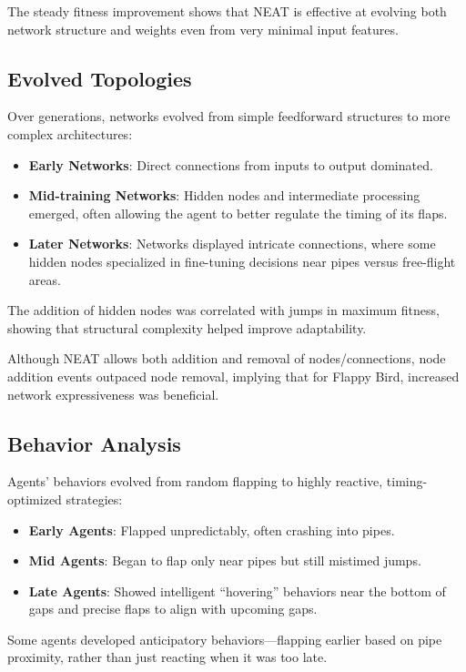 \documentclass[sigconf]{acmart}
\begin{document}
The steady fitness improvement shows that NEAT is effective at evolving both network structure and weights even from very minimal input features.

\subsection{Evolved Topologies}
Over generations, networks evolved from simple feedforward structures to more complex architectures:
\begin{itemize}
    \item \textbf{Early Networks}: Direct connections from inputs to output dominated.
    \item \textbf{Mid-training Networks}: Hidden nodes and intermediate processing emerged, often allowing the agent to better regulate the timing of its flaps.
    \item \textbf{Later Networks}: Networks displayed intricate connections, where some hidden nodes specialized in fine-tuning decisions near pipes versus free-flight areas.
\end{itemize}

The addition of hidden nodes was correlated with jumps in maximum fitness, showing that structural complexity helped improve adaptability.

Although NEAT allows both addition and removal of nodes/connections, node addition events outpaced node removal, implying that for Flappy Bird, increased network expressiveness was beneficial.

\subsection{Behavior Analysis}
Agents' behaviors evolved from random flapping to highly reactive, timing-optimized strategies:
\begin{itemize}
    \item \textbf{Early Agents}: Flapped unpredictably, often crashing into pipes.
    \item \textbf{Mid Agents}: Began to flap only near pipes but still mistimed jumps.
    \item \textbf{Late Agents}: Showed intelligent ``hovering'' behaviors near the bottom of gaps and precise flaps to align with upcoming gaps.
\end{itemize}

Some agents developed anticipatory behaviors---flapping earlier based on pipe proximity, rather than just reacting when it was too late.
\end{document}
